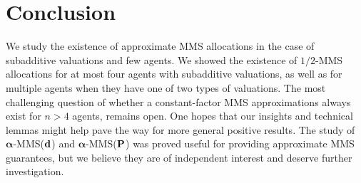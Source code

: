 \section{Conclusion}
We study the existence of approximate MMS allocations in the case of subadditive valuations and few agents. We showed the existence of $1/2$-MMS allocations for at most four agents with subadditive valuations, as well as for multiple agents when they have one of two types of valuations.
The most challenging question of whether a constant-factor MMS approximations always exist for $n > 4$ agents, remains open. One hopes that our insights and technical lemmas might help pave the way for more general positive results. The study of $\boldsymbol{\alpha}$-MMS(${\bf d}$) and $\boldsymbol{\alpha}$-MMS(${\bf P}$) was proved useful for providing approximate MMS guarantees, but we believe they are of independent interest and deserve further investigation. 






